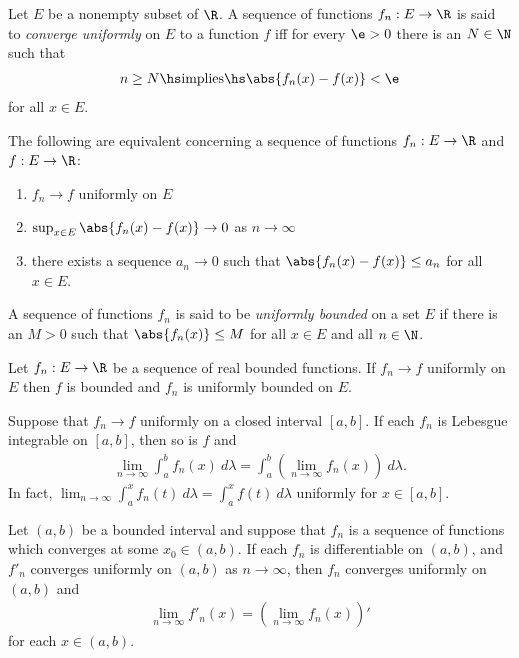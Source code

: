 \documentclass{article}
\begin{document}
\begin{definition}
	Let $E$ be a nonempty subset of $\R$. A sequence of functions $f_n:E\to\R$ is said to
	\emph{converge uniformly} on $E$ to a function $f$ iff for every $\e>0$ there
	is an $N\in\N$ such that
	\begin{align*}
		n\geq N\hs\text{implies}\hs \abs{f_n(x)-f(x)}<\e
	\end{align*}
	for all $x\in E$.
\end{definition}

\begin{proposition}
	The following are equivalent concerning a sequence of functions $f_n:E\to\R$ and $f:E\to\R$:
	\begin{enumerate}
		\item $f_n\to f$ uniformly on $E$
		\item $\sup_{x\in E}\abs{f_n(x)-f(x)}\to 0$ as $n\to\infty$
		\item there exists a sequence $a_n\to 0$ such that $\abs{f_n(x)-f(x)}\leq a_n$ for all $x\in E$.
	\end{enumerate}
\end{proposition}

\begin{definition}
	A sequence of functions $f_n$ is said to be \emph{uniformly bounded} on a set $E$ if there
	is an $M>0$ such that $\abs{f_n(x)}\leq M$ for all $x\in E$ and all $n\in\N$.
\end{definition}

\begin{lemma}
	Let $f_n:E\to\R$ be a sequence of real bounded functions. If $f_n\to f$ uniformly on $E$
	then $f$ is bounded and $f_n$ is uniformly bounded on $E$.
\end{lemma}

\begin{theorem}[Notes 2.2]
	Suppose that $f_n\to f$ uniformly on a closed interval $[a,b]$. If each $f_n$ is Lebesgue integrable
	on $[a,b]$, then so is $f$ and
	\begin{align*}
		\lim_{n\to\infty} \int_a^b f_n(x)\:d\lambda = \int_a^b\left(\lim_{n\to\infty}f_n(x)\right)\:d\lambda.
	\end{align*}
	In fact, $\lim_{n\to\infty} \int_a^x f_n(t)\:d\lambda = \int_a^x f(t)\:d\lambda$ uniformly for $x\in[a,b]$.
\end{theorem}

\begin{theorem}[Notes 2.3]
	Let $(a,b)$ be a bounded interval and suppose that $f_n$ is a sequence of functions which converges
	at some $x_0\in(a,b)$. If each $f_n$ is differentiable on $(a,b)$, and $f'_n$ converges uniformly
	on $(a,b)$ as $n\to\infty$, then $f_n$ converges uniformly on $(a,b)$ and
	\begin{align*}
		\lim_{n\to\infty}f'_n(x)= \left(\lim_{n\to\infty}f_n(x)\right)'
	\end{align*}
	for each $x\in(a,b)$.
\end{theorem}
\end{document}

